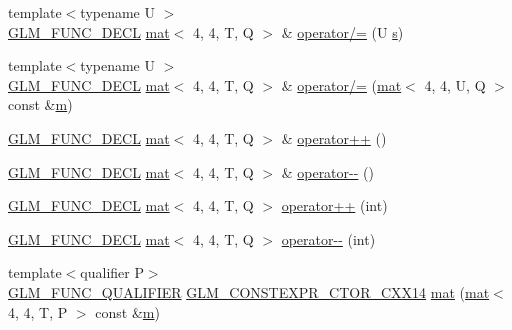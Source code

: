\begin{DoxyCompactItemize}
\item 
{\footnotesize template$<$typename U $>$ }\\\hyperlink{setup_8hpp_ab2d052de21a70539923e9bcbf6e83a51}{G\+L\+M\+\_\+\+F\+U\+N\+C\+\_\+\+D\+E\+CL} \hyperlink{structglm_1_1mat}{mat}$<$ 4, 4, T, Q $>$ \& \hyperlink{structglm_1_1mat_3_014_00_014_00_01_t_00_01_q_01_4_a518f7ffaaea8e439f279bf319977b9ca}{operator/=} (U \hyperlink{_s_d_l__opengl_8h_a4af680a6c683f88ed67b76f207f2e6e4}{s})
\item 
{\footnotesize template$<$typename U $>$ }\\\hyperlink{setup_8hpp_ab2d052de21a70539923e9bcbf6e83a51}{G\+L\+M\+\_\+\+F\+U\+N\+C\+\_\+\+D\+E\+CL} \hyperlink{structglm_1_1mat}{mat}$<$ 4, 4, T, Q $>$ \& \hyperlink{structglm_1_1mat_3_014_00_014_00_01_t_00_01_q_01_4_ad786f3d74c405ba7fb25905a8c0e1705}{operator/=} (\hyperlink{structglm_1_1mat}{mat}$<$ 4, 4, U, Q $>$ const \&\hyperlink{_s_d_l__opengl__glext_8h_af593500c283bf1a787a6f947f503a5c2}{m})
\item 
\hyperlink{setup_8hpp_ab2d052de21a70539923e9bcbf6e83a51}{G\+L\+M\+\_\+\+F\+U\+N\+C\+\_\+\+D\+E\+CL} \hyperlink{structglm_1_1mat}{mat}$<$ 4, 4, T, Q $>$ \& \hyperlink{structglm_1_1mat_3_014_00_014_00_01_t_00_01_q_01_4_a39435dc193ef8ac3a8c417651ae6440e}{operator++} ()
\item 
\hyperlink{setup_8hpp_ab2d052de21a70539923e9bcbf6e83a51}{G\+L\+M\+\_\+\+F\+U\+N\+C\+\_\+\+D\+E\+CL} \hyperlink{structglm_1_1mat}{mat}$<$ 4, 4, T, Q $>$ \& \hyperlink{structglm_1_1mat_3_014_00_014_00_01_t_00_01_q_01_4_a3c62ee9d03614c428b3e7d81dac27f8c}{operator-\/-\/} ()
\item 
\hyperlink{setup_8hpp_ab2d052de21a70539923e9bcbf6e83a51}{G\+L\+M\+\_\+\+F\+U\+N\+C\+\_\+\+D\+E\+CL} \hyperlink{structglm_1_1mat}{mat}$<$ 4, 4, T, Q $>$ \hyperlink{structglm_1_1mat_3_014_00_014_00_01_t_00_01_q_01_4_a63e4b9e5fd2328e10fe75fec5ab1a10b}{operator++} (int)
\item 
\hyperlink{setup_8hpp_ab2d052de21a70539923e9bcbf6e83a51}{G\+L\+M\+\_\+\+F\+U\+N\+C\+\_\+\+D\+E\+CL} \hyperlink{structglm_1_1mat}{mat}$<$ 4, 4, T, Q $>$ \hyperlink{structglm_1_1mat_3_014_00_014_00_01_t_00_01_q_01_4_a3f3b1e563c8dcf771cb1ab9767869232}{operator-\/-\/} (int)
\item 
{\footnotesize template$<$qualifier P$>$ }\\\hyperlink{setup_8hpp_a33fdea6f91c5f834105f7415e2a64407}{G\+L\+M\+\_\+\+F\+U\+N\+C\+\_\+\+Q\+U\+A\+L\+I\+F\+I\+ER} \hyperlink{setup_8hpp_a0900f9145e68bf6061b6f5e7be3fa751}{G\+L\+M\+\_\+\+C\+O\+N\+S\+T\+E\+X\+P\+R\+\_\+\+C\+T\+O\+R\+\_\+\+C\+X\+X14} \hyperlink{structglm_1_1mat_3_014_00_014_00_01_t_00_01_q_01_4_a201642febedfc558e98f60763db82ee4}{mat} (\hyperlink{structglm_1_1mat}{mat}$<$ 4, 4, T, P $>$ const \&\hyperlink{_s_d_l__opengl__glext_8h_af593500c283bf1a787a6f947f503a5c2}{m})

\end{DoxyCompactItemize}
